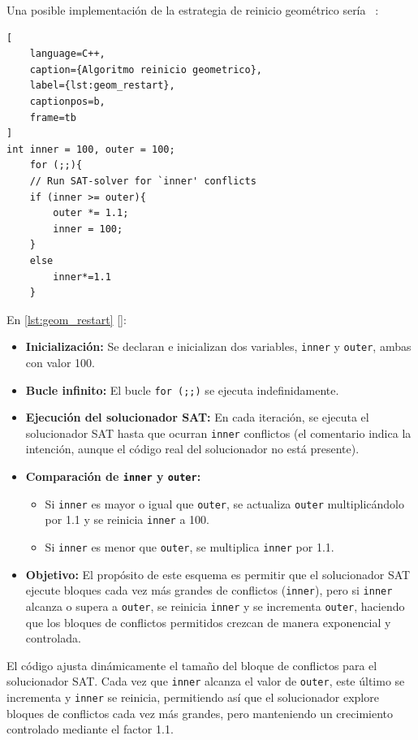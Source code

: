 Una posible implementaci\'on de la estrategia de reinicio geom\'etrico ser\'ia \ :

\begin{lstlisting}[
    language=C++,
    caption={Algoritmo reinicio geometrico},
    label={lst:geom_restart},
    captionpos=b,
    frame=tb
]
int inner = 100, outer = 100;
	for (;;){
	// Run SAT-solver for `inner' conflicts
	if (inner >= outer){
		outer *= 1.1;
		inner = 100;
	}
	else
		inner*=1.1
	}

\end{lstlisting}

En \ref{lst:geom_restart} [\cite{oliveras2009dpll_cdcl}]:
\begin{itemize}
    \item \textbf{Inicialización:} Se declaran e inicializan dos variables, \texttt{inner} y \texttt{outer}, ambas con valor 100.
    \item \textbf{Bucle infinito:} El bucle \texttt{for (;;)} se ejecuta indefinidamente.
    \item \textbf{Ejecución del solucionador SAT:} En cada iteración, se ejecuta el solucionador SAT hasta que ocurran \texttt{inner} conflictos (el comentario indica la intención, aunque el código real del solucionador no está presente).
    \item \textbf{Comparación de \texttt{inner} y \texttt{outer}:}
    \begin{itemize}
        \item Si \texttt{inner} es mayor o igual que \texttt{outer}, se actualiza \texttt{outer} multiplicándolo por 1.1 y se reinicia \texttt{inner} a 100.
        \item Si \texttt{inner} es menor que \texttt{outer}, se multiplica \texttt{inner} por 1.1.
    \end{itemize}
    \item \textbf{Objetivo:} El propósito de este esquema es permitir que el solucionador SAT ejecute bloques cada vez más grandes de conflictos (\texttt{inner}), pero si \texttt{inner} alcanza o supera a \texttt{outer}, se reinicia \texttt{inner} y se incrementa \texttt{outer}, haciendo que los bloques de conflictos permitidos crezcan de manera exponencial y controlada.
\end{itemize}

El código ajusta dinámicamente el tamaño del bloque de conflictos para el solucionador SAT. Cada vez que \texttt{inner} alcanza el valor de \texttt{outer}, este último se incrementa y \texttt{inner} se reinicia, permitiendo así que el solucionador explore bloques de conflictos cada vez más grandes, pero manteniendo un crecimiento controlado mediante el factor 1.1.

